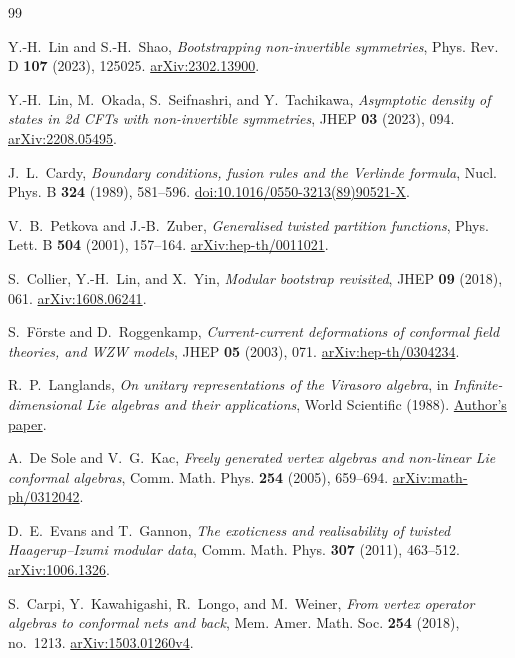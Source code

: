 \begin{thebibliography}{99}
\raggedright

Y.-H.~Lin and S.-H.~Shao,
\emph{Bootstrapping non-invertible symmetries},
Phys. Rev. D \textbf{107} (2023), 125025.
\href{https://arxiv.org/abs/2302.13900}{arXiv:2302.13900}.

Y.-H.~Lin, M.~Okada, S.~Seifnashri, and Y.~Tachikawa,
\emph{Asymptotic density of states in 2d CFTs with non-invertible symmetries},
JHEP \textbf{03} (2023), 094.
\href{https://arxiv.org/abs/2208.05495}{arXiv:2208.05495}.

J.~L.~Cardy,
\emph{Boundary conditions, fusion rules and the Verlinde formula},
Nucl. Phys. B \textbf{324} (1989), 581--596.
\href{https://doi.org/10.1016/0550-3213(89)90521-X}{doi:10.1016/0550-3213(89)90521-X}.

V.~B.~Petkova and J.-B.~Zuber,
\emph{Generalised twisted partition functions},
Phys. Lett. B \textbf{504} (2001), 157--164.
\href{https://arxiv.org/abs/hep-th/0011021}{arXiv:hep-th/0011021}.


S.~Collier, Y.-H.~Lin, and X.~Yin,
\emph{Modular bootstrap revisited},
JHEP \textbf{09} (2018), 061.
\href{https://arxiv.org/abs/1608.06241}{arXiv:1608.06241}.

S.~F\"orste and D.~Roggenkamp,
\emph{Current-current deformations of conformal field theories, and WZW models},
JHEP \textbf{05} (2003), 071.
\href{https://arxiv.org/abs/hep-th/0304234}{arXiv:hep-th/0304234}.

R.~P.~Langlands,
\emph{On unitary representations of the Virasoro algebra},
in \emph{Infinite-dimensional Lie algebras and their applications},
World Scientific (1988).
\href{https://publications.ias.edu/sites/default/files/VirasoroAlg-ps.pdf}{Author's paper}.

A.~De Sole and V.~G.~Kac,
\emph{Freely generated vertex algebras and non-linear Lie conformal algebras},
Comm. Math. Phys. \textbf{254} (2005), 659--694.
\href{https://arxiv.org/abs/math-ph/0312042}{arXiv:math-ph/0312042}.

D.~E.~Evans and T.~Gannon,
\emph{The exoticness and realisability of twisted Haagerup--Izumi modular data},
Comm. Math. Phys. \textbf{307} (2011), 463--512.
\href{https://arxiv.org/abs/1006.1326}{arXiv:1006.1326}.

S.~Carpi, Y.~Kawahigashi, R.~Longo, and M.~Weiner,
\emph{From vertex operator algebras to conformal nets and back},
Mem. Amer. Math. Soc. \textbf{254} (2018), no.~1213.
\href{https://arxiv.org/abs/1503.01260v4}{arXiv:1503.01260v4}.


\end{thebibliography}
